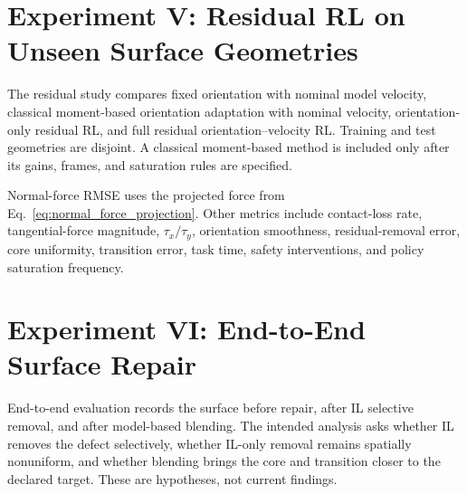 \section{Experiment V: Residual RL on Unseen Surface Geometries}
The residual study compares fixed orientation with nominal model velocity, classical moment-based orientation adaptation with nominal velocity, orientation-only residual RL, and full residual orientation--velocity RL. Training and test geometries are disjoint. A classical moment-based method is included only after its gains, frames, and saturation rules are specified.

Normal-force RMSE uses the projected force from Eq.~\eqref{eq:normal_force_projection}. Other metrics include contact-loss rate, tangential-force magnitude, \(\tau_x/\tau_y\), orientation smoothness, residual-removal error, core uniformity, transition error, task time, safety interventions, and policy saturation frequency.

\begin{table}
\centering
\caption{Planned residual RL ablation on unseen smooth surface geometries.}
\label{tab:residual_rl_ablation}
\scriptsize
{}
\end{table}
\clearpage

\section{Experiment VI: End-to-End Surface Repair}
End-to-end evaluation records the surface before repair, after IL selective removal, and after model-based blending. The intended analysis asks whether IL removes the defect selectively, whether IL-only removal remains spatially nonuniform, and whether blending brings the core and transition closer to the declared target. These are hypotheses, not current findings.

